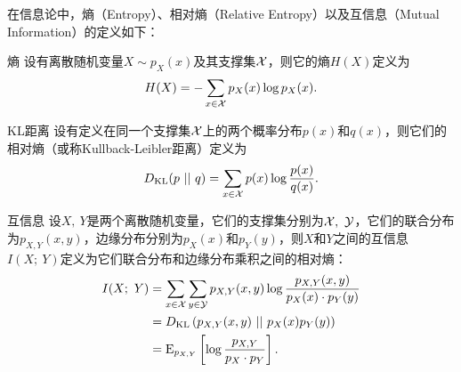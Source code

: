 在信息论中，熵（Entropy）、相对熵（Relative Entropy）以及互信息（Mutual Information）的定义如下\citep{cover2012elements}：
\begin{definition}{熵}
  设有离散随机变量$X \sim p_X(x)$及其支撑集$\mathcal{X}$，则它的熵$H(X)$定义为
  \begin{equation}
    H(X) = -\sum_{x\in\mathcal{X}} p_X(x) \log p_X(x).
  \end{equation}
  \label{def:entropy}
\end{definition}
\begin{definition}{KL距离}
  设有定义在同一个支撑集$\mathcal{X}$上的两个概率分布$p(x)$和$q(x)$，则它们的相对熵（或称Kullback-Leibler距离）定义为
  \begin{equation}
    D_{\text{KL}}(p~||~q) = \sum_{x\in\mathcal{X}} p(x)\log \frac{p(x)}{q(x)}.
  \end{equation}
  \label{def:relative-entropy}
\end{definition}
\begin{definition}{互信息}
  设$X,~Y$是两个离散随机变量，它们的支撑集分别为$\mathcal{X},~\mathcal{Y}$，它们的联合分布为$p_{X,Y}(x, y)$，边缘分布分别为$p_X(x)$和$p_Y(y)$，则$X$和$Y$之间的互信息$I(X;~Y)$定义为它们联合分布和边缘分布乘积之间的相对熵：
  \begin{equation}
    \begin{split}
      I(X;~Y) &= \sum_{x\in\mathcal{X}}\sum_{y\in\mathcal{Y}} 
      p_{X,Y}(x,y) \log\frac{p_{X,Y}(x,y)}{p_X(x) \cdot p_Y(y)}  \\
            &= D_{\text{KL}}\left( p_{X,Y}(x,y)~||~p_X(x) p_Y(y) \right) \\
            &= \text{E}_{p_{X,Y}} \left[ 
              \log\frac{p_{X,Y}}{p_X \cdot p_Y}
              \right].
    \end{split}
    \label{eq:mutual-information}
  \end{equation}
  \label{def:mutual-information}
\end{definition}


